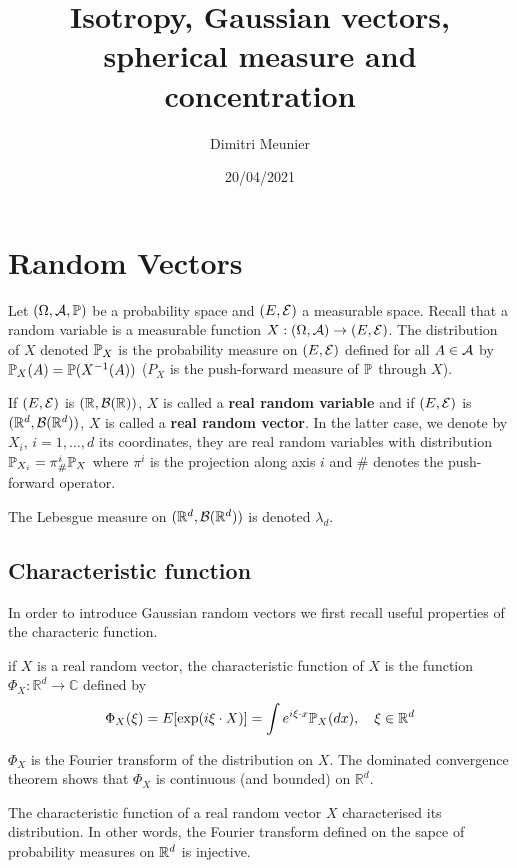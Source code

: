 \documentclass{article}
\title{Isotropy, Gaussian vectors, spherical measure and concentration}
\author{Dimitri Meunier}
\date{20/04/2021}
\begin{document}
\maketitle

\section{Random Vectors}

Let $(\Omega,\cA,\P)$ be a probability space and $(E,\cE)$ a measurable space.
Recall that a random variable is a measurable function $X:(\Omega,\cA) \to
(E,\cE)$. The distribution of $X$ denoted $\P_X$ is the probability measure on
$(E,\cE)$ defined for all $A \in \cA$ by $\P_X(A) = \P(X^{-1}(A))$ ($P_X$ is the
push-forward measure of $\P$ through $X$).

If $(E,\cE)$ is $(\R,\cB(\R))$, $X$ is called a \textbf{real random
variable} and if $(E,\cE)$ is $(\Rd,\cB(\Rd))$, $X$ is called a
\textbf{real random vector}. In the latter case, we denote by $X_i$,
$i=1,\ldots,d$ its coordinates, they are real random variables with distribution
$\P_{X_i} = \pi^i_{\#}\P_X$ where $\pi^i$ is the projection along axis $i$ and
$\#$ denotes the push-forward operator.

The Lebesgue measure on $(\Rd,\cB(\Rd))$ is denoted $\lambda_d$.

\subsection{Characteristic function}

In order to introduce Gaussian random vectors we first recall useful properties
of the characteric function.

\begin{definition}
  if $X$ is a real random vector, the characteristic function of $X$ is the function
  $\Phi_{X}: \mathbb{R}^{d} \longrightarrow \mathbb{C}$ defined by 
  $$
  \Phi_{X}(\xi)=E[\exp (i \xi \cdot X)] = \int e^{i \xi \cdot x} \P_{X}(d x), \quad \xi \in \mathbb{R}^{d}
  $$

  $\Phi_{X}$ is the Fourier transform of the distribution on $X$. The dominated
  convergence theorem shows that $\Phi_{X}$ is continuous (and bounded) on $\mathbb{R}^{d}$.
\end{definition}

\begin{theorem}
  The characteristic function of a real random vector $X$ characterised its
  distribution. In other words, the Fourier transform defined on the sapce of
  probability measures on $\Rd$ is injective. 
\end{theorem}
\end{document}
